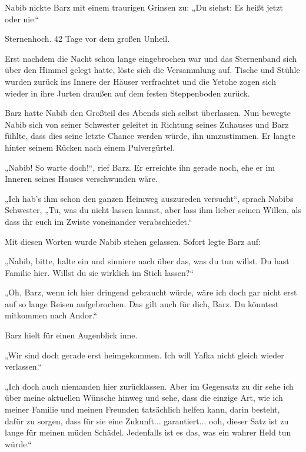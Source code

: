 Nabib nickte Barz mit einem traurigen Grinsen zu: „Du siehst: Es heißt jetzt oder nie.“



\trennzeichen



Sternenhoch. 42 Tage vor dem großen Unheil.\bigskip



Erst nachdem die Nacht schon lange eingebrochen war und das Sternenband sich über den Himmel gelegt hatte, löste sich die Versammlung auf. Tische und Stühle wurden zurück ins Innere der Häuser verfrachtet und die Yetohe zogen sich wieder in ihre Jurten draußen auf dem festen Steppenboden zurück.

Barz hatte Nabib den Großteil des Abends sich selbst überlassen. Nun bewegte Nabib sich von seiner Schwester geleitet in Richtung seines Zuhauses und Barz fühlte, dass dies seine letzte Chance werden würde, ihn umzustimmen. Er langte hinter seinem Rücken nach einem Pulvergürtel.

„Nabib! So warte doch!“, rief Barz. Er erreichte ihn gerade noch, ehe er im Inneren seines Hauses verschwunden wäre.

„Ich hab’s ihm schon den ganzen Heimweg auszureden versucht“, sprach Nabibs Schwester, „Tu, was du nicht lassen kannst, aber lass ihm lieber seinen Willen, als dass ihr euch im Zwiste voneinander verabschiedet.“

Mit diesen Worten wurde Nabib stehen gelassen. Sofort legte Barz auf:

„Nabib, bitte, halte ein und sinniere nach über das, was du tun willst. Du hast Familie hier. Willst du sie wirklich im Stich lassen?“

„Oh, Barz, wenn ich hier dringend gebraucht würde, wäre ich doch gar nicht erst auf so lange Reisen aufgebrochen. Das gilt auch für dich, Barz. Du könntest mitkommen nach Andor.“

Barz hielt für einen Augenblick inne.

„Wir sind doch gerade erst heimgekommen. Ich will Yafka nicht gleich wieder verlassen.“

„Ich doch auch niemanden hier zurücklassen. Aber im Gegensatz zu dir sehe ich über meine aktuellen Wünsche hinweg und sehe, dass die einzige Art, wie ich meiner Familie und meinen Freunden tatsächlich helfen kann, darin besteht, dafür zu sorgen, dass für sie eine Zukunft... garantiert... ooh, dieser Satz ist zu lange für meinen müden Schädel. Jedenfalls ist es das, was ein wahrer Held tun würde.“

